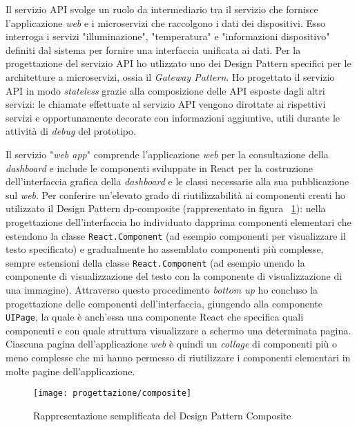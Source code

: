 Il servizio API svolge un ruolo da intermediario tra il servizio che fornisce l'applicazione \emph{web} e i microservizi che raccolgono i dati dei dispositivi.
Esso interroga i servizi "illuminazione", "temperatura" e "informazioni dispositivo"  definiti dal sistema per fornire una interfaccia unificata ai dati.
Per la progettazione del servizio API ho utlizzato uno dei Design Pattern specifici per le architetture a microservizi, ossia il \emph{Gateway Pattern}.
Ho progettato il servizio API in modo \emph{stateless} grazie alla composizione delle API esposte dagli altri servizi: le chiamate effettuate al servizio API vengono dirottate ai rispettivi servizi e opportunamente decorate con informazioni aggiuntive, utili durante le attività di \emph{debug} del prototipo.

Il servizio "\emph{web app}" comprende l'applicazione \emph{web} per la consultazione della \emph{dashboard} e include le componenti sviluppate in React per la costruzione dell'interfaccia grafica della \emph{dashboard} e le classi necessarie alla sua pubblicazione sul \emph{web}.
Per conferire un'elevato grado di riutilizzabilità ai componenti creati ho utilizzato il Design Pattern \gls{dp-composite} (rappresentato in figura ~\ref{fig:composite}): nella progettazione dell'interfaccia ho individuato dapprima componenti elementari che estendono la classe \texttt{React.Component} (ad esempio componenti per visualizzare il testo specificato) e gradualmente ho assemblato componenti più complesse, sempre estensioni della classe \texttt{React.Component} (ad esempio unendo la componente di visualizzazione del testo con la componente di visualizzazione di una immagine). Attraverso questo procedimento \emph{bottom up} ho concluso la progettazione delle componenti dell'interfaccia, giungendo alla componente \texttt{UIPage}, la quale è anch'essa una componente React che specifica quali componenti e con quale struttura visualizzare a schermo una determinata pagina. Ciascuna pagina dell'applicazione \emph{web} è quindi un \emph{collage} di componenti più o meno complesse che mi hanno permesso di riutilizzare i componenti elementari in molte pagine dell'applicazione.

\begin{figure}[H]
    \centering
    \texttt{[image: progettazione/composite]}
    \caption{Rappresentazione semplificata del Design Pattern Composite}
    \label{fig:composite}
\end{figure}

